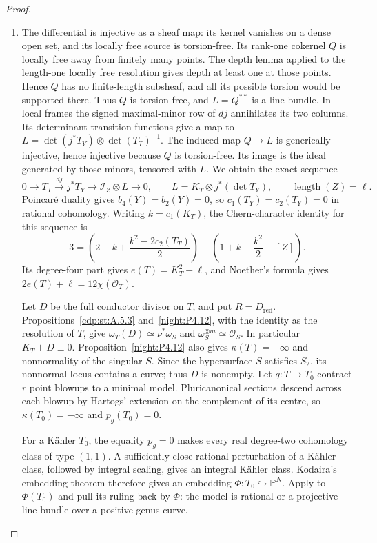 \begin{proof}

\begin{enumerate}[label={$\langle1\rangle$\arabic*.},leftmargin=*]
\item The differential is injective as a sheaf map: its kernel vanishes
on a dense open set, and its locally free source is torsion-free.
Its rank-one cokernel $Q$ is locally free away from finitely many
points. The depth lemma applied to the length-one locally free
resolution gives depth at least one at those points. Hence $Q$
has no finite-length subsheaf, and all its possible torsion would
be supported there. Thus $Q$ is torsion-free, and $L=Q^{**}$ is a
line bundle. In local frames the signed maximal-minor row of $dj$
annihilates its two columns. Its determinant transition functions
give a map to $L=\det(j^*T_Y)\otimes\det(T_T)^{-1}$.
The induced map $Q\to L$ is generically injective, hence injective
because $Q$ is torsion-free. Its image is the ideal generated by
those minors, tensored with $L$. We obtain the exact sequence
\[
 0\longrightarrow T_T\xrightarrow{dj}j^*T_Y
   \longrightarrow\mathcal I_Z\otimes L\longrightarrow0,
 \qquad L=K_T\otimes j^*(\det T_Y),\qquad
 \operatorname{length}(Z)=\ell.
\]
Poincar\'e duality gives $b_4(Y)=b_2(Y)=0$, so
$c_1(T_Y)=c_2(T_Y)=0$ in rational cohomology. Writing $k=c_1(K_T)$,
the Chern-character identity for this sequence is
\[
 3=\left(2-k+\frac{k^2-2c_2(T_T)}2\right)
     +\left(1+k+\frac{k^2}2-[Z]\right).
\]
Its degree-four part gives $e(T)=K_T^2-\ell$, and Noether's formula
gives $2e(T)+\ell=12\chi(\mathcal O_T)$.

Let $D$ be the full conductor divisor on $T$, and put $R=D_{\mathrm{red}}$.
Propositions~\ref{cdp:st:A.5.3} and~\ref{night:P4.12}, with the
identity as the resolution of $T$, give
$\omega_T(D)\simeq\nu^*\omega_S$ and $\omega_S^{\otimes m}\simeq\mathcal O_S$.
In particular $K_T+D\equiv0$. Proposition~\ref{night:P4.12}
also gives $\kappa(T)=-\infty$ and nonnormality of the singular $S$.
Since the hypersurface $S$ satisfies $S_2$, its nonnormal locus
contains a curve; thus $D$ is nonempty.
Let $q:T\to T_0$ contract $r$ point blowups to a minimal model.
Pluricanonical sections descend across each blowup by Hartogs'
extension on the complement of its centre, so $\kappa(T_0)=-\infty$
and $p_g(T_0)=0$.

For a K\"ahler $T_0$, the equality $p_g=0$ makes every real
degree-two cohomology class of type $(1,1)$. A sufficiently close
rational perturbation of a K\"ahler class, followed by integral
scaling, gives an integral K\"ahler class. Kodaira's embedding
theorem \cite[Main Theorem, p.~314]{Kodaira1954} therefore gives an
embedding $\Phi:T_0\hookrightarrow\mathbb P^N$. Apply
\cite[VI.17--VI.18, pp.~111--112; V.10, pp.~79--80; III.10, p.~40]{Beauville1978}
to $\Phi(T_0)$ and pull its ruling back by $\Phi$: the model is
rational or a projective-line bundle over a positive-genus curve.


\end{enumerate}
\end{proof}
